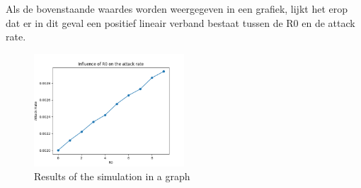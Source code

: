 \documentclass{article}
\begin{document}
Als de bovenstaande waardes worden weergegeven in een grafiek, lijkt het erop dat er in dit geval een positief lineair verband bestaat tussen de R0 en de attack rate.

\begin{figure}[h]
	\centering
	\includegraphics[width=0.5\textwidth]{r0}
	\caption{Results of the simulation in a graph}
\end{figure}
\end{document}
